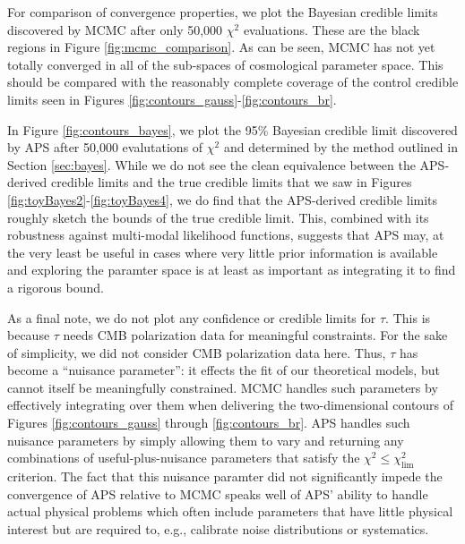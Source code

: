 \documentclass[useAMS,usenatbib]{aastex}
\begin{document}
For comparison of convergence properties, we plot the Bayesian credible limits discovered
by MCMC after only 50,000 $\chi^2$ evaluations.  These are the black regions in
Figure \ref{fig:mcmc_comparison}.  As can be seen, MCMC has not yet totally converged
in all of the sub-spaces of cosmological parameter space.  This should be compared
with the reasonably complete coverage of the control credible limits seen in
Figures \ref{fig:contours_gauss}-\ref{fig:contours_br}.

In Figure \ref{fig:contours_bayes}, we plot the 95\% Bayesian credible limit discovered
by APS after 50,000 evalutations of $\chi^2$ and determined by the method outlined in
Section \ref{sec:bayes}.  While we do not see the clean equivalence between the APS-derived credible limits and
the true credible limits that we saw in Figures \ref{fig:toyBayes2}-\ref{fig:toyBayes4},
we do find that the APS-derived credible limits roughly sketch the bounds of the 
true credible limit.  This, combined with its robustness against multi-modal likelihood
functions, suggests that APS may, at the very least be useful in cases where very little
prior information is available and exploring the paramter space is at least as important as
integrating it to find a rigorous bound.

As a final note, we do not plot any confidence or 
credible limits for $\tau$.
This is because $\tau$ needs CMB polarization data for meaningful constraints.  For the sake
of simplicity, we did not consider CMB polarization data here.  Thus, $\tau$ has become a
``nuisance parameter'': it effects the fit of our theoretical models, but cannot itself be
meaningfully constrained.  MCMC handles such parameters by effectively integrating over them
when delivering the two-dimensional contours of Figures
\ref{fig:contours_gauss} through \ref{fig:contours_br}.  
APS handles such nuisance parameters by
simply allowing them to vary and returning any combinations of useful-plus-nuisance parameters
that satisfy the $\chi^2\le\chi^2_\text{lim}$ criterion.  The fact that this nuisance
paramter did not significantly impede the convergence of APS relative to MCMC speaks 
well of
APS' ability to handle actual physical problems which 
often include parameters that have
little physical interest but are required to, e.g., 
calibrate noise distributions or
systematics.
\end{document}
